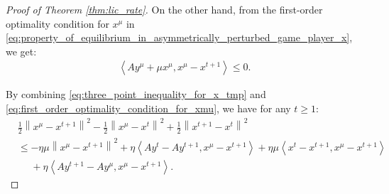 \documentclass{article}
\theoremstyle{plain}
\begin{document}
\begin{proof}[Proof of Theorem \ref{thm:lic_rate}]
    On the other hand, from the first-order optimality condition for $x^{\mu}$ in \eqref{eq:property_of_equilibrium_in_asymmetrically_perturbed_game_player_x}, we get:
    \begin{align}
        \left\langle Ay^{\mu} + \mu x^{\mu}, x^{\mu} - x^{t+1}\right\rangle \leq 0.
        \label{eq:first_order_optimality_condition_for_xmu}
    \end{align}

    By combining \eqref{eq:three_point_inequality_for_x_tmp} and \eqref{eq:first_order_optimality_condition_for_xmu}, we have for any $t\geq 1$:
    \begin{align}
        & \frac{1}{2}\left\|x^{\mu} - x^{t+1}\right\|^2 - \frac{1}{2}\left\|x^{\mu} - x^t\right\|^2 + \frac{1}{2}\left\|x^{t+1} - x^t\right\|^2 \nonumber                                                 \\
        & \leq - \eta \mu\left\|x^{\mu} - x^{t+1}\right\|^2 + \eta \left\langle Ay^t - Ay^{t+1}, x^{\mu} - x^{t+1}\right\rangle + \eta \mu\left\langle x^t - x^{t+1}, x^{\mu} - x^{t+1}\right\rangle \nonumber \\
        & \phantom{=} + \eta \left\langle Ay^{t+1} - Ay^{\mu}, x^{\mu} - x^{t+1}\right\rangle.
        \label{eq:three_point_inequality_for_x}
    \end{align}



\end{proof}
\end{document}
